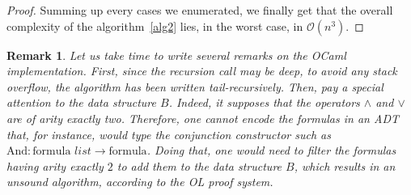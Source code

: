 \documentclass[a4paper, 11pt]{article}
\newtheorem*{remark}{Remark}
\begin{document}
\begin{proof}
	    Summing up every cases we enumerated, we finally get that the overall complexity of the 
	    algorithm~\ref{alg2} lies, in the worst case, in $\mathcal{O}(n^3)$.
    \end{proof}
    \begin{remark}
	    Let us take time to write several remarks on the OCaml implementation. First, since the
	    recursion call may be deep, to avoid any
	    stack overflow, the algorithm has been written tail-recursively. Then, pay a special 
	    attention
	    to the data structure $B$. Indeed, it supposes that the operators $\wedge$ and $\vee$ are of
	    arity exactly two. Therefore, one cannot encode the formulas in an ADT that, for instance,
	    would type the conjunction constructor such as 
	    $\text{And}:\text{formula }list\rightarrow\text{formula}$. Doing that, one would need to
	    filter the formulas having arity exactly $2$ to add them to the data structure $B$, which
	    results in an unsound algorithm, according to the OL proof system.
    \end{remark}
\end{document}

